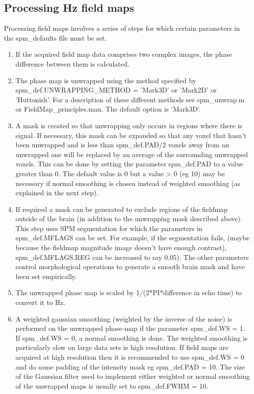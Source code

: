 \subsection{Processing Hz field maps}
Processing field maps involves a series of steps for which certain parameters in the spm\_defaults file must be set.
\begin{enumerate}
\item{If the acquired field map data comprises two complex images, the phase difference between them is calculated. 
}
\item{The phase map is unwrapped using the method specified by spm\_def.UNWRAPPING\_METHOD = 'Mark3D' or 'Mark2D' or 'Huttonish'. For a description of these different methods see spm\_unwrap.m or FieldMap\_principles.man. The default option is 'Mark3D'.
}
\item{A mask is created so that unwrapping only occurs in regions where there is signal. If necessary, this mask can be expanded so that any voxel that hasn't been unwrapped and is less than spm\_def.PAD/2 voxels away from an unwrapped one will be replaced by an average of the surrounding unwrapped voxels. This can be done by setting the parameter spm\_def.PAD to a value greater than 0. The default value is 0 but a value > 0 (eg 10) may be necessary if normal smoothing is chosen instead of weighted smoothing (as explained in the next step). 
}
\item{If required a mask can be generated to exclude regions of the fieldmap outside of the brain (in addition to the unwrapping mask described above). This step uses SPM segmentation for which the parameters in spm\_def.MFLAGS can be set. For example, if the segmentation fails, (maybe because the fieldmap magnitude image doesn't have enough contrast), spm\_def.MFLAGS.REG can be increased to say 0.05). The other parameters control morphological operations to generate a smooth brain mask and have been set empirically.
}
\item{The unwrapped phase map is scaled by 1/(2*PI*difference in echo time) to convert it to Hz.
}
\item{A weighted gaussian smoothing (weighted by the inverse of the noise) is performed on the unwrapped phase-map if the parameter spm\_def.WS = 1. If spm\_def.WS = 0, a normal smoothing is done. The weighted smoothing is particularly slow on large data sets ie high resolution. If field maps are acquired at high resolution then it is recommended to use spm\_def.WS = 0 and do some padding of the intensity mask eg spm\_def.PAD = 10. The size of the Gaussian filter used to implement either weighted or normal smoothing of the unwrapped maps is usually set to spm\_def.FWHM = 10.
}
\end{enumerate}

